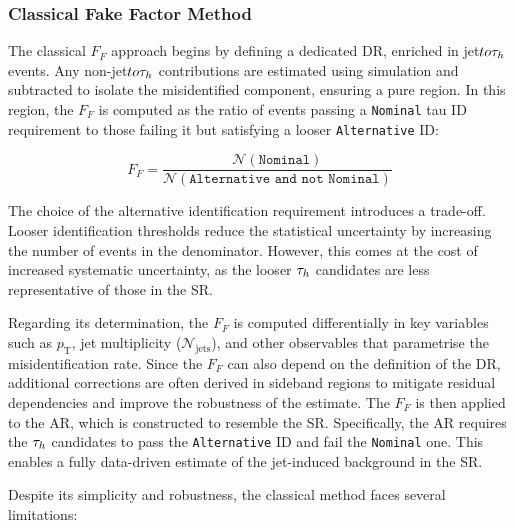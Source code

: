 \subsubsection{Classical Fake Factor Method}
\label{Section:Chapter6_FakeFactors_Classical}

The classical $F_F$ approach begins by defining a dedicated \ac{DR}, enriched in jet$to\tau_h$ events. Any non-jet$to\tau_h$ contributions are estimated using simulation and subtracted to isolate the misidentified component, ensuring a pure region. In this region, the $F_F$ is computed as the ratio of events passing a \texttt{Nominal} tau ID requirement to those failing it but satisfying a looser \texttt{Alternative} ID:

\begin{equation}
F_F = \frac{\mathcal{N}(\texttt{Nominal})}{\mathcal{N}(\texttt{Alternative and not Nominal})}
\end{equation}

The choice of the alternative identification requirement introduces a trade-off. Looser identification thresholds reduce the statistical uncertainty by increasing the number of events in the denominator. However, this comes at the cost of increased systematic uncertainty, as the looser $\tau_h$ candidates are less representative of those in the \ac{SR}. 

Regarding its determination, the $F_F$ is computed differentially in key variables such as $p_\text{T}$, jet multiplicity ($\mathcal{N}_{\text{jets}}$), and other observables that parametrise the misidentification rate. Since the $F_F$ can also depend on the definition of the \ac{DR}, additional corrections are often derived in sideband regions to mitigate residual dependencies and improve the robustness of the estimate. The $F_F$ is then applied to the \ac{AR}, which is constructed to resemble the \ac{SR}. Specifically, the \ac{AR} requires the $\tau_h$ candidates to pass the \texttt{Alternative} ID and fail the \texttt{Nominal} one. This enables a fully data-driven estimate of the jet-induced background in the \ac{SR}.

Despite its simplicity and robustness, the classical method faces several limitations:

